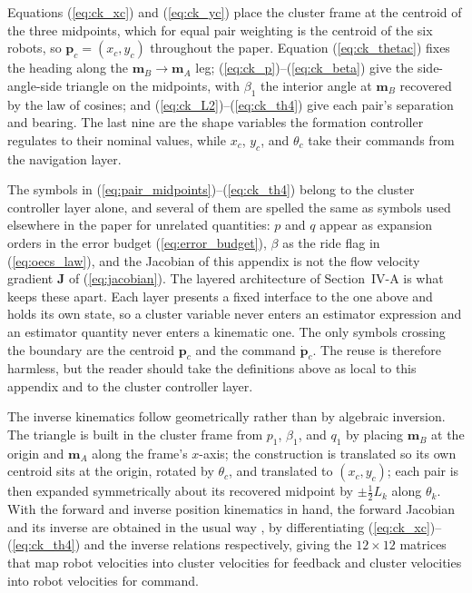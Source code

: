 \documentclass[lettersize,journal]{IEEEtran}
\begin{document}
Equations (\ref{eq:ck_xc}) and (\ref{eq:ck_yc}) place the cluster
frame at the centroid of the three midpoints, which for equal pair
weighting is the centroid of the six robots, so $\mathbf{p}_c =
(x_c, y_c)$ throughout the paper. Equation (\ref{eq:ck_thetac}) fixes
the heading along the $\mathbf{m}_B \to \mathbf{m}_A$ leg;
(\ref{eq:ck_p})--(\ref{eq:ck_beta}) give the side-angle-side triangle
on the midpoints, with $\beta_1$ the interior angle at
$\mathbf{m}_B$ recovered by the law of cosines; and
(\ref{eq:ck_L2})--(\ref{eq:ck_th4}) give each pair's separation and
bearing. The last nine are the shape variables the formation
controller regulates to their nominal values, while $x_c$, $y_c$, and
$\theta_c$ take their commands from the navigation layer.

The symbols in (\ref{eq:pair_midpoints})--(\ref{eq:ck_th4}) belong to
the cluster controller layer alone, and several of them are spelled the
same as symbols used elsewhere in the paper for unrelated quantities:
$p$ and $q$ appear as expansion orders in the error budget
(\ref{eq:error_budget}), $\beta$ as the ride flag in
(\ref{eq:oecs_law}), and the Jacobian of this appendix is not the flow
velocity gradient $\mathbf{J}$ of (\ref{eq:jacobian}). The layered
architecture of Section~\mbox{IV-A} is what keeps these apart. Each
layer presents a fixed interface to the one above and holds its own
state, so a cluster variable never enters an estimator expression and
an estimator quantity never enters a kinematic one. The only symbols
crossing the boundary are the centroid $\mathbf{p}_c$ and the command
$\dot{\mathbf{p}}_c$. The reuse is therefore harmless, but the reader
should take the definitions above as local to this appendix and to the
cluster controller layer.

The inverse kinematics follow geometrically rather than by algebraic
inversion. The triangle is built in the cluster frame from $p_1$,
$\beta_1$, and $q_1$ by placing $\mathbf{m}_B$ at the origin and
$\mathbf{m}_A$ along the frame's $x$-axis; the construction is
translated so its own centroid sits at the origin, rotated by
$\theta_c$, and translated to $(x_c, y_c)$; each pair is then expanded
symmetrically about its recovered midpoint by $\pm\tfrac{1}{2}L_k$
along $\theta_k$. With the forward and inverse position kinematics in
hand, the forward Jacobian and its inverse are obtained in the usual
way \cite{37}, by differentiating (\ref{eq:ck_xc})--(\ref{eq:ck_th4})
and the inverse relations respectively, giving the $12 \times 12$
matrices that map robot velocities into cluster velocities for feedback
and cluster velocities into robot velocities for command.
\end{document}
